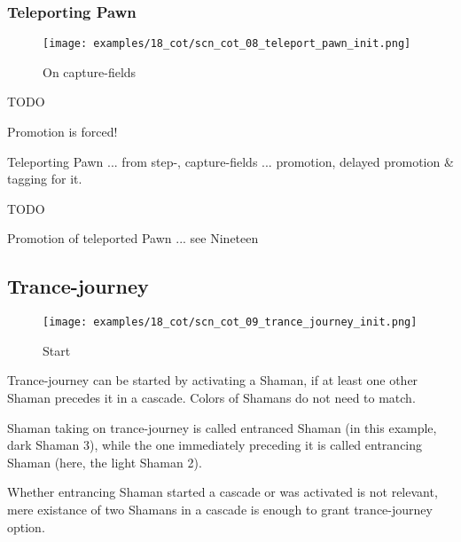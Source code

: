 \clearpage %

\subsubsection*{Teleporting Pawn}

\noindent
\begin{figure}[!h]
\texttt{[image: examples/18\_cot/scn\_cot\_08\_teleport\_pawn\_init.png]}
\caption{On capture-fields}
\label{fig:scn_cot_08_teleport_pawn_init}
\end{figure}

\huge{TODO}
\normalsize{}

Promotion is forced!

Teleporting Pawn ... from step-, capture-fields ... promotion, delayed promotion \& tagging for it.

\huge{TODO}
\normalsize{}

Promotion of teleported Pawn ... see Nineteen

\clearpage %

\subsection*{Trance-journey}

\noindent
\begin{wrapfigure}[13]{l}{0.4\textwidth}
\centering
\texttt{[image: examples/18\_cot/scn\_cot\_09\_trance\_journey\_init.png]}
\caption{Start}
\label{fig:scn_cot_09_trance_journey_init}
\end{wrapfigure}
Trance-journey can be started by activating a Shaman, if at least one other
Shaman precedes it in a cascade. Colors of Shamans do not need to match.

Shaman taking on trance-journey is called entranced Shaman (in this example,
dark Shaman 3), while the one immediately preceding it is called entrancing
Shaman (here, the light Shaman 2).

Whether entrancing Shaman started a cascade or was activated is not relevant,
mere existance of two Shamans in a cascade is enough to grant trance-journey
option.

